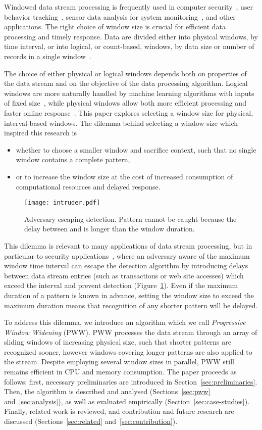 \documentclass[runningheads,a4paper]{llncs}
\begin{document}
Windowed data stream processing is frequently used in computer
security~\cite{WFP99,VJ07,YDK14}, user behavior
tracking~\cite{ABA+14}, sensor data analysis for system
monitoring~\cite{AFN+07}, and other applications. The right
choice of window size is crucial for efficient data processing
and timely response. Data are divided either into physical
windows, by time interval, or into logical, or count-based,
windows, by data size or number of records in a single
window~\cite{GO03,G12}. 

The choice of either physical or logical
windows depends both on properties of the data stream and on the
objective of the data processing algorithm. Logical
windows are more naturally handled by machine learning
algorithms with inputs of fixed size~\cite{G12}, while
physical windows allow both more efficient
processing and faster online response~\cite{HYZ+10,ZDL+12,ZDL+13}.
This paper explores selecting a window size for
physical, interval-based windows. The dilemma behind selecting
a window size which inspired this research is 
\begin{itemize}
    \item  whether to choose a
smaller window and sacrifice context, such that no single window
contains a complete pattern,
\item or to increase the window size at the cost of increased
    consumption of computational resources and delayed response.
\end{itemize}
\begin{figure}
    \centering
	\texttt{[image: intruder.pdf]}
    \caption{Adversary escaping detection. Pattern 
    cannot be caught because the delay between 
    and  is longer than the window duration.}
    \label{fig:intruder}
\end{figure}
This dilemma is relevant to many applications of data stream
processing, but in particular to security
applications~\cite{WFP99,VJ07,YDK14}, where an adversary
aware of the maximum window time interval can escape the
detection algorithm by introducing delays between data stream
entries (such as transactions or web site accesses) which exceed
the interval and prevent detection (Figure~\ref{fig:intruder}).
Even if the maximum duration of a pattern is known in advance,
setting the window size to exceed the maximum duration means
that recognition of any shorter pattern will be delayed.

To address this dilemma, we introduce an algorithm which we call
\textit{Progressive Window Widening} (PWW). PWW processes the
data stream through an array of sliding windows of increasing
physical size, such that shorter patterns are recognized sooner,
however windows covering longer patterns are also applied to the
stream.  Despite employing several window sizes in parallel, PWW
still remains efficient in CPU and memory consumption. The paper
proceeds as follows: first, necessary preliminaries are
introduced in Section~\ref{sec:preliminaries}. Then, the
algorithm is described and analysed (Sections~\ref{sec:pww}
and~\ref{sec:analysis}), as well as evaluated empirically
(Section~\ref{sec:case-studies}).  Finally, related work is
reviewed, and contribution and future research are discussed
(Sections~\ref{sec:related} and~\ref{sec:contribution}).
\end{document}
